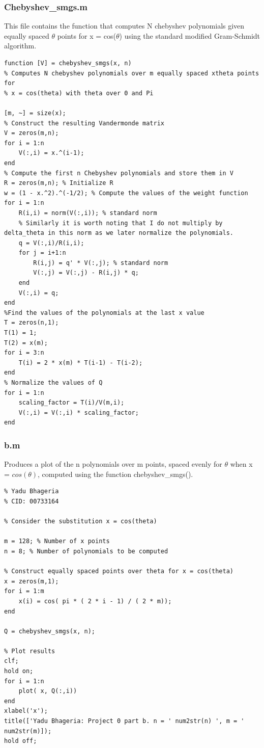 \documentclass[a4paper,10pt]{article}
\begin{document}
\subsubsection{Chebyshev\_smgs.m}

This file contains the function that computes N chebyshev polynomials given equally spaced $\theta$ points for x = cos($\theta$) using the standard modified Gram-Schmidt algorithm.

\begin{lstlisting}
function [V] = chebyshev_smgs(x, n)
% Computes N chebyshev polynomials over m equally spaced xtheta points for
% x = cos(theta) with theta over 0 and Pi

[m, ~] = size(x);
% Construct the resulting Vandermonde matrix
V = zeros(m,n); 
for i = 1:n
    V(:,i) = x.^(i-1);
end
% Compute the first n Chebyshev polynomials and store them in V
R = zeros(m,n); % Initialize R
w = (1 - x.^2).^(-1/2); % Compute the values of the weight function
for i = 1:n
    R(i,i) = norm(V(:,i)); % standard norm
    % Similarly it is worth noting that I do not multiply by delta_theta in this norm as we later normalize the polynomials.
    q = V(:,i)/R(i,i);
    for j = i+1:n
        R(i,j) = q' * V(:,j); % standard norm
        V(:,j) = V(:,j) - R(i,j) * q;
    end
    V(:,i) = q;
end
%Find the values of the polynomials at the last x value
T = zeros(n,1); 
T(1) = 1;
T(2) = x(m);
for i = 3:n
    T(i) = 2 * x(m) * T(i-1) - T(i-2);
end
% Normalize the values of Q
for i = 1:n
    scaling_factor = T(i)/V(m,i);
    V(:,i) = V(:,i) * scaling_factor;
end
\end{lstlisting}
\subsubsection{b.m}

Produces a plot of the n polynomials over m points, spaced evenly for $\theta$ when x = $cos(\theta)$, computed using the function chebyshev\_smgs().

\begin{lstlisting}
% Yadu Bhageria
% CID: 00733164

% Consider the substitution x = cos(theta)

m = 128; % Number of x points
n = 8; % Number of polynomials to be computed

% Construct equally spaced points over theta for x = cos(theta)
x = zeros(m,1);
for i = 1:m
    x(i) = cos( pi * ( 2 * i - 1) / ( 2 * m));
end

Q = chebyshev_smgs(x, n);

% Plot results
clf;
hold on;
for i = 1:n
    plot( x, Q(:,i))
end
xlabel('x');
title(['Yadu Bhageria: Project 0 part b. n = ' num2str(n) ', m = ' num2str(m)]);
hold off;
\end{lstlisting}
\end{document}
